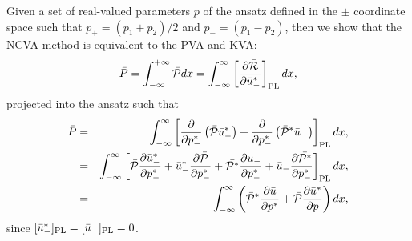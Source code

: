 Given a set of real-valued parameters $p$ of the ansatz defined in the $\pm$ coordinate space such that $p_+ = (p_1 + p_2)/2$ and $p_- = (p_1 - p_2)$, then we show that the NCVA method is equivalent to the PVA and KVA:
\begin{align}
 \bar{P}  = \int_{-\infty}^{+\infty} \bar{\mathcal{P}} dx = \int_{-\infty}^{\infty} \left[\frac{\partial \bar{\mathcal{R}}}{\partial \bar{u}_-^* } \right]_{\rm PL} dx,
\end{align} 
 projected into the ansatz such that 
 \begin{eqnarray}
\bar{P} &=& \int_{-\infty}^{\infty}  \left[\frac{\partial}{\partial p_-^*} \left(\bar{\mathcal{P}}   \bar{u}_-^* \right)  +
          \frac{\partial}{\partial p_-^*} \left(\bar{\mathcal{P}}^* \bar{u}_-   \right) \right]_{\rm PL} dx, \nonumber  \\
          &=& \int_{-\infty}^{\infty} \left[\bar{\mathcal{P}} \frac{\partial \bar{u}_-^* }{\partial p_-^*} + \bar{u}_-^* \frac{\partial \bar{\mathcal{P}}  }{\partial p_-^*}  + \bar{\mathcal{P^*}} \frac{\partial \bar{u}_- }{\partial p_-^*} + \bar{u}_- \frac{\partial \bar{\mathcal{P^*}}  }{\partial p_-^*}    \right]_{\rm PL} dx, \nonumber \\
&=& \int_{-\infty}^{\infty} \left(
\bar{\mathcal{P}}^* \frac{\partial  \bar{u}}{\partial p^*}
+
\bar{\mathcal{P}} \frac{\partial  \bar{u}^*}{\partial p }
\right) dx, \label{eq:NCVAequiv}
\end{eqnarray}
since $[\bar{u}_-^*]_{\rm PL} = [\bar{u}_-]_{\rm PL} = 0$.

